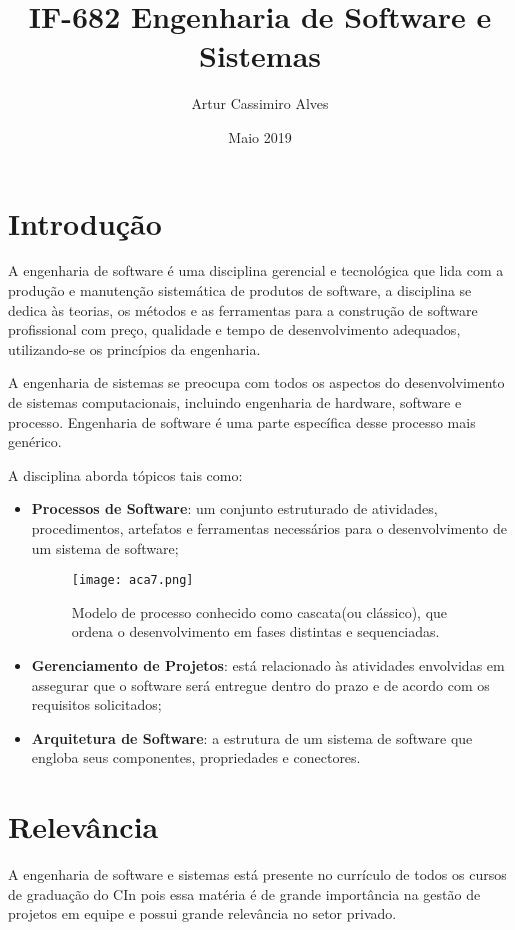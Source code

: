 \documentclass[10pt]{article}
\title{IF-682 Engenharia de Software e Sistemas}
\author{Artur Cassimiro Alves}
\date{Maio 2019}
\begin{document}
\maketitle

\section{Introdução}
A engenharia de software é uma disciplina gerencial e tecnológica que lida com a produção e manutenção sistemática de produtos de software, a disciplina se dedica às teorias, os métodos e as ferramentas para a construção de software profissional com preço, qualidade e tempo de desenvolvimento adequados, utilizando-se os princípios da engenharia.\citep{IntES}

A engenharia de sistemas se preocupa com todos os aspectos do desenvolvimento de sistemas computacionais, incluindo engenharia de hardware, software e processo. Engenharia de software é uma parte específica desse processo mais genérico.\citep{SommervilleES2011}

A disciplina aborda tópicos tais como:

\begin{itemize}
    \item \textbf{Processos de Software}: um conjunto estruturado de atividades, procedimentos, artefatos e ferramentas necessários para o desenvolvimento de um sistema de software;\citep{ProcessosSoftware}
        \begin{figure}[h!]
        \centering
        \texttt{[image: aca7.png]}
        \caption{Modelo de processo conhecido como cascata(ou clássico), que ordena o desenvolvimento em fases distintas e sequenciadas.}\citep{Imagem}
        \label{fig:aca7}
        \end{figure}
    
    \item \textbf{Gerenciamento de Projetos}: está relacionado às atividades envolvidas em assegurar que o software será entregue dentro do prazo e de acordo com os requisitos solicitados;\citep{GerenciamentoProjetos}
    
    \item \textbf{Arquitetura de Software}: a estrutura de um sistema de software que engloba seus componentes, propriedades e conectores.\citep{ArquiteturaSoftware}
    
\end{itemize}

\section{Relevância}
A engenharia de software e sistemas está presente no currículo de todos os cursos de graduação do CIn pois essa matéria é de grande importância na gestão de projetos em equipe e possui grande relevância no setor privado.
\end{document}
